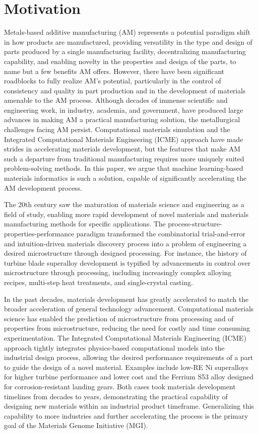\section{Motivation}

Metals-based additive manufacturing (AM) represents a potential paradigm shift in how products are manufactured, providing versatility in the type and design of parts produced by a single manufacturing facility, decentralizing manufacturing capability, and enabling novelty in the properties and design of the parts, to name but a few benefits AM offers. However, there have been significant roadblocks to fully realize AM's potential, particularly in the control of consistency and quality in part production and in the development of materials amenable to the AM process. Although decades of immense scientific and engineering work, in industry, academia, and government, have produced large advances in making AM a practical manufacturing solution, the metallurgical challenges facing AM persist. Computational materials simulation and the Integrated Computational Materials Engineering (ICME) approach have made strides in accelerating materials development, but the features that make AM such a departure from traditional manufacturing requires more uniquely suited problem-solving methods. In this paper, we argue that machine learning-based materials informatics is such a solution, capable of significantly accelerating the AM development process.


The 20th century saw the maturation of materials science and engineering as a field of study, enabling more rapid development of novel materials and materials manufacturing methods for specific applications. The process-structure-properties-performance paradigm transformed the combinatorial trial-and-error and intuition-driven materials discovery process into a problem of engineering a desired microstructure through designed processing. For instance, the history of turbine blade superalloy development is typified by advancements in control over microstructure through processing, including increasingly complex alloying recipes, multi-step heat treatments, and single-crystal casting. 

In the past decades, materials development has greatly accelerated to match the broader acceleration of general technology advancement. Computational materials science has enabled the prediction of microstructure from processing and of properties from microstructure, reducing the need for costly and time consuming experimentation. The Integrated Computational Materials Engineering (ICME) approach tightly integrates physics-based computational models into the industrial design process, allowing the desired performance requirements of a part to guide the design of a novel material. Examples include low-RE Ni superalloys for higher turbine performance and lower cost and the Ferrium S53 alloy designed for corrosion-resistant landing gears. Both cases took materials development timelines from decades to years, demonstrating the practical capability of designing new materials within an industrial product timeframe. Generalizing this capability to more industries and further accelerating the process is the primary goal of the Materials Genome Initiative (MGI). 

